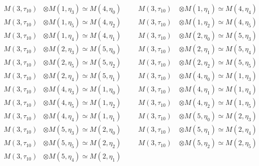 \begin{align*}
M(3,\tau_{10}) &\otimes M(1,\eta_{3}) \simeq M(4,\eta_{0}) &&& M(3,\tau_{10}) \
&\otimes M(1,\eta_{1}) \simeq M(4,\eta_{4})\\
M(3,\tau_{10}) &\otimes M(1,\eta_{5}) \simeq M(4,\eta_{2}) &&& M(3,\tau_{10}) \
&\otimes M(1,\eta_{2}) \simeq M(4,\eta_{5})\\
M(3,\tau_{10}) &\otimes M(1,\eta_{4}) \simeq M(4,\eta_{1}) &&& M(3,\tau_{10}) \
&\otimes M(2,\eta_{0}) \simeq M(5,\eta_{3})\\
M(3,\tau_{10}) &\otimes M(2,\eta_{3}) \simeq M(5,\eta_{0}) &&& M(3,\tau_{10}) \
&\otimes M(2,\eta_{1}) \simeq M(5,\eta_{4})\\
M(3,\tau_{10}) &\otimes M(2,\eta_{5}) \simeq M(5,\eta_{2}) &&& M(3,\tau_{10}) \
&\otimes M(2,\eta_{2}) \simeq M(5,\eta_{5})\\
M(3,\tau_{10}) &\otimes M(2,\eta_{4}) \simeq M(5,\eta_{1}) &&& M(3,\tau_{10}) \
&\otimes M(4,\eta_{0}) \simeq M(1,\eta_{3})\\
M(3,\tau_{10}) &\otimes M(4,\eta_{3}) \simeq M(1,\eta_{0}) &&& M(3,\tau_{10}) \
&\otimes M(4,\eta_{1}) \simeq M(1,\eta_{4})\\
M(3,\tau_{10}) &\otimes M(4,\eta_{5}) \simeq M(1,\eta_{2}) &&& M(3,\tau_{10}) \
&\otimes M(4,\eta_{2}) \simeq M(1,\eta_{5})\\
M(3,\tau_{10}) &\otimes M(4,\eta_{4}) \simeq M(1,\eta_{1}) &&& M(3,\tau_{10}) \
&\otimes M(5,\eta_{0}) \simeq M(2,\eta_{3})\\
M(3,\tau_{10}) &\otimes M(5,\eta_{3}) \simeq M(2,\eta_{0}) &&& M(3,\tau_{10}) \
&\otimes M(5,\eta_{1}) \simeq M(2,\eta_{4})\\
M(3,\tau_{10}) &\otimes M(5,\eta_{5}) \simeq M(2,\eta_{2}) &&& M(3,\tau_{10}) \
&\otimes M(5,\eta_{2}) \simeq M(2,\eta_{5})\\
M(3,\tau_{10}) &\otimes M(5,\eta_{4}) \simeq M(2,\eta_{1})\\
\end{align*}

